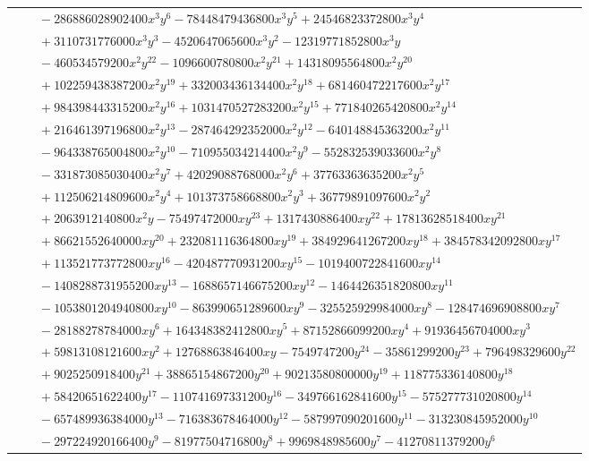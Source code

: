\documentclass[11pt]{article}
\begin{document}
\begin{longtable}{@{}ll@{}}
 & $\quad -286886028902400x^{3}y^{6}-78448479436800x^{3}y^{5}+24546823372800x^{3}y^{4}$\\
 & $\quad +3110731776000x^{3}y^{3}-4520647065600x^{3}y^{2}-12319771852800x^{3}y$\\
 & $\quad -460534579200x^{2}y^{22}-1096600780800x^{2}y^{21}+14318095564800x^{2}y^{20}$\\
 & $\quad +102259438387200x^{2}y^{19}+332003436134400x^{2}y^{18}+681460472217600x^{2}y^{17}$\\
 & $\quad +984398443315200x^{2}y^{16}+1031470527283200x^{2}y^{15}+771840265420800x^{2}y^{14}$\\
 & $\quad +216461397196800x^{2}y^{13}-287464292352000x^{2}y^{12}-640148845363200x^{2}y^{11}$\\
 & $\quad -964338765004800x^{2}y^{10}-710955034214400x^{2}y^{9}-552832539033600x^{2}y^{8}$\\
 & $\quad -331873085030400x^{2}y^{7}+42029088768000x^{2}y^{6}+37763363635200x^{2}y^{5}$\\
 & $\quad +112506214809600x^{2}y^{4}+101373758668800x^{2}y^{3}+36779891097600x^{2}y^{2}$\\
 & $\quad +2063912140800x^{2}y-75497472000xy^{23}+1317430886400xy^{22}+17813628518400xy^{21}$\\
 & $\quad +86621552640000xy^{20}+232081116364800xy^{19}+384929641267200xy^{18}+384578342092800xy^{17}$\\
 & $\quad +113521773772800xy^{16}-420487770931200xy^{15}-1019400722841600xy^{14}$\\
 & $\quad -1408288731955200xy^{13}-1688657146675200xy^{12}-1464426351820800xy^{11}$\\
 & $\quad -1053801204940800xy^{10}-863990651289600xy^{9}-325525929984000xy^{8}-128474696908800xy^{7}$\\
 & $\quad -28188278784000xy^{6}+164348382412800xy^{5}+87152866099200xy^{4}+91936456704000xy^{3}$\\
 & $\quad +59813108121600xy^{2}+12768863846400xy-7549747200y^{24}-35861299200y^{23}+796498329600y^{22}$\\
 & $\quad +9025250918400y^{21}+38865154867200y^{20}+90213580800000y^{19}+118775336140800y^{18}$\\
 & $\quad +58420651622400y^{17}-110741697331200y^{16}-349766162841600y^{15}-575277731020800y^{14}$\\
 & $\quad -657489936384000y^{13}-716383678464000y^{12}-587997090201600y^{11}-313230845952000y^{10}$\\
 & $\quad -297224920166400y^{9}-81977504716800y^{8}+9969848985600y^{7}-41270811379200y^{6}$\\

\end{longtable}
\end{document}
